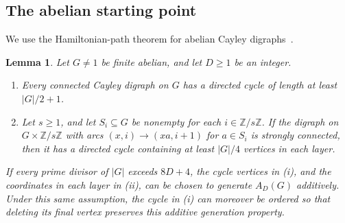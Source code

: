 \documentclass[11pt,a4paper,reqno]{amsart}
\newtheorem{lemma}[theorem]{Lemma}
\theoremstyle{definition}
\theoremstyle{remark}
\numberwithin{equation}{section}
\newcommand{\Z}{\mathbb Z}
\begin{document}
\subsection{The abelian starting point}
We use the Hamiltonian-path theorem for abelian Cayley digraphs~\cite[Lemma 2.1]{Morris}.
\begin{lemma}\label{lem:abelian}
Let $G\ne1$ be finite abelian, and let $D\ge1$ be an integer.
\begin{enumerate}
\item Every connected Cayley digraph on $G$ has a directed cycle of length at least $|G|/2+1$.
\item Let $s\ge1$, and let $S_i\subseteq G$ be nonempty for each $i\in\Z/s\Z$. If the digraph on $G\times\Z/s\Z$ with arcs $(x,i)\to(xa,i+1)$ for $a\in S_i$ is strongly connected, then it has a directed cycle containing at least $|G|/4$ vertices in each layer.
\end{enumerate}
If every prime divisor of $|G|$ exceeds $8D+4$, the cycle vertices in (i), and the coordinates in each layer in (ii), can be chosen to generate $A_D(G)$ additively. Under this same assumption, the cycle in (i) can moreover be ordered so that deleting its final vertex preserves this additive generation property.
\end{lemma}
\end{document}
